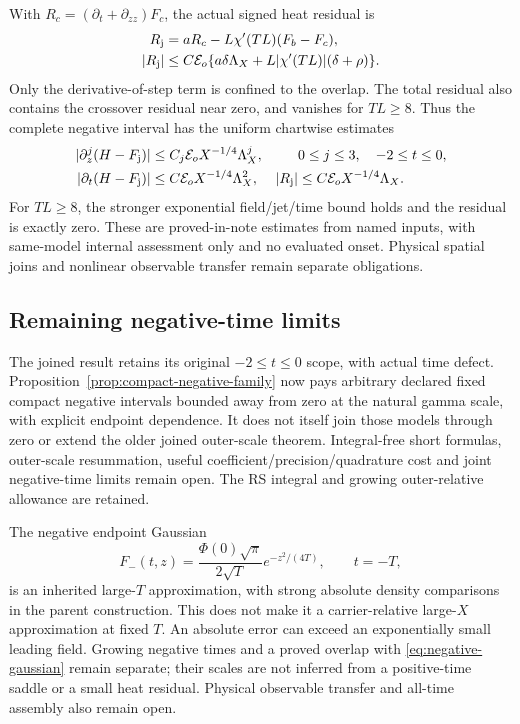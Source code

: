 \documentclass[11pt]{article}
\numberwithin{equation}{section}
\begin{document}
With \(R_c=(\partial_t+\partial_{zz})F_c\), the actual signed
heat residual is
\begin{align}
 R_{\rm j}&=aR_c-L\chi'(TL)(F_b-F_c),
             \label{eq:joined-residual}\\
 |R_{\rm j}|&\le C\mathcal E_o\{a\delta\Lambda_X
                  +L|\chi'(TL)|(\delta+\rho)\}.
\end{align}
Only the derivative-of-step term is confined to the overlap. The total
residual also contains the crossover residual near zero, and vanishes
for \(TL\ge8\). Thus the complete negative interval has the uniform
chartwise estimates
\begin{align}
 |\partial_z^j(H-F_{\rm j})|&\le C_j\mathcal E_oX^{-1/4}\Lambda_X^j,
                           &&0\le j\le3,\quad -2\le t\le0,
                       \label{eq:negative-interval-jets}\\
 |\partial_t(H-F_{\rm j})|&\le C\mathcal E_oX^{-1/4}\Lambda_X^2,
 & |R_{\rm j}|&\le C\mathcal E_oX^{-1/4}\Lambda_X.
                       \label{eq:negative-interval-time}
\end{align}
For \(TL\ge8\), the stronger exponential field/jet/time bound holds
and the residual is exactly zero. These are proved-in-note estimates
from named inputs, with same-model internal assessment only and no
evaluated onset. Physical spatial joins and nonlinear observable
transfer remain separate obligations.


\subsection{Remaining negative-time limits}
The joined result retains its original \(-2\le t\le0\) scope,
with actual time defect. Proposition~\ref{prop:compact-negative-family}
now pays arbitrary declared fixed compact negative intervals bounded
away from zero at the natural gamma scale, with explicit endpoint
dependence. It does not itself join those models through zero or
extend the older joined outer-scale theorem. Integral-free short
formulas, outer-scale resummation, useful coefficient/precision/quadrature
cost and joint negative-time limits remain open. The RS integral and
growing outer-relative allowance are retained.

The negative endpoint Gaussian
\begin{equation}
F_-(t,z)=\frac{\Phi(0)\sqrt\pi}{2\sqrt T}
                       e^{-z^2/(4T)},\qquad t=-T,
\label{eq:negative-gaussian}
\end{equation}
is an inherited large-\(T\) approximation, with strong absolute density
comparisons in the parent construction. This does not make it a
carrier-relative large-\(X\) approximation at fixed \(T\). An absolute
error can exceed an exponentially small leading field. Growing negative
times and a proved overlap with \eqref{eq:negative-gaussian} remain
separate; their scales are not inferred from a positive-time saddle or
a small heat residual. Physical observable transfer and all-time
assembly also remain open.
\end{document}
